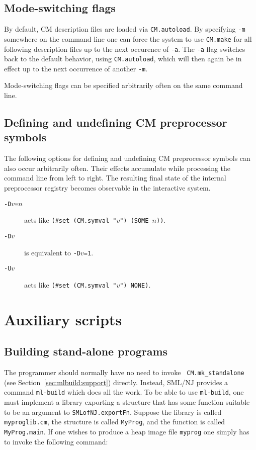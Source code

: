 \documentclass[titlepage,letterpaper]{article}
\begin{document}
\subsection{Mode-switching flags}

By default, CM description files are loaded via {\tt CM.autoload}.  By
specifying {\tt -m} somewhere on the command line one can force the
system to use {\tt CM.make} for all following description files up to
the next occurence of {\tt -a}.  The {\tt -a} flag switches back to
the default behavior, using {\tt CM.autoload}, which will then again
be in effect up to the next occurrence of another {\tt -m}.

Mode-switching flags can be specified arbitrarily often on the same
command line.

\subsection{Defining and undefining CM preprocessor symbols}
\label{sec:cmdline:defundef}

The following options for defining and undefining CM preprocessor
symbols can also occur arbitrarily often.  Their effects accumulate
while processing the command line from left to right.  The resulting
final state of the internal preprocessor registry becomes observable
in the interactive system.

\begin{description}
\item[{\tt -D$v$=$n$}] acts like {\tt (\#set (CM.symval "$v$") (SOME $n$))}.
\item[{\tt -D$v$}] is equivalent to {\tt -D$v$=1}.
\item[{\tt -U$v$}] acts like {\tt (\#set (CM.symval "$v$") NONE)}.
\end{description}

\section{Auxiliary scripts}

\subsection{Building stand-alone programs}
\label{sec:mlbuild}

The programmer should normally have no need to invoke {\tt
CM.mk\_standalone} (see Section~\ref{sec:mlbuild:support}) directly.
Instead, SML/NJ provides a command {\tt ml-build} which does all the
work.  To be able to use {\tt ml-build}, one must implement a library
exporting a structure that has some function suitable to be an
argument to {\tt SMLofNJ.exportFn}.  Suppose the library is called
{\tt myproglib.cm}, the structure is called {\tt MyProg}, and the
function is called {\tt MyProg.main}.  If one wishes to produce a heap
image file {\tt myprog} one simply has to invoke the following
command:
\end{document}
